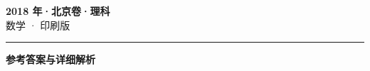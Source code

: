 \documentclass[zihao=5, a4paper]{ctexart}
\begin{document}
\begin{center}
  {\Large\bfseries 2018 年·北京卷·理科}\\[4pt]
  {\large 数学 · 印刷版}
\end{center}
\medskip
{}

\par\bigskip\hrule\bigskip
{}
\begin{center}{\large\bfseries 参考答案与详细解析}\end{center}
\smallskip

\end{document}
